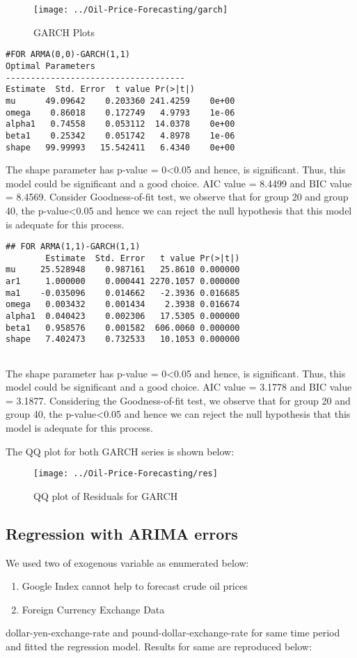 \documentclass[11pt,a4paper]{article}
\begin{document}
\begin{figure}[h!]
	\centering
	\texttt{[image: ../Oil-Price-Forecasting/garch]}
	\caption{GARCH Plots}
	\label{fig:garch}
\end{figure}

\begin{lstlisting}
#FOR ARMA(0,0)-GARCH(1,1)
Optimal Parameters
------------------------------------
Estimate  Std. Error  t value Pr(>|t|)
mu      49.09642    0.203360 241.4259    0e+00
omega    0.86018    0.172749   4.9793    1e-06
alpha1   0.74558    0.053112  14.0378    0e+00
beta1    0.25342    0.051742   4.8978    1e-06
shape   99.99993   15.542411   6.4340    0e+00

\end{lstlisting}
The shape parameter has p-value = 0<0.05 and hence, is significant. Thus, this model could be significant and a good choice. AIC value = 8.4499 and BIC value = 8.4569. Consider Goodness-of-fit test, we observe that for group 20 and group 40, the p-value<0.05 and hence we can reject the null hypothesis that this model is adequate for this process.


\begin{lstlisting}
## FOR ARMA(1,1)-GARCH(1,1)
        Estimate  Std. Error   t value Pr(>|t|)
mu     25.528948    0.987161   25.8610 0.000000
ar1     1.000000    0.000441 2270.1057 0.000000
ma1    -0.035096    0.014662   -2.3936 0.016685
omega   0.003432    0.001434    2.3938 0.016674
alpha1  0.040423    0.002306   17.5305 0.000000
beta1   0.958576    0.001582  606.0060 0.000000
shape   7.402473    0.732533   10.1053 0.000000


\end{lstlisting}
The shape parameter has p-value = 0<0.05 and hence, is significant. Thus, this model could be significant and a good choice. AIC value =  3.1778 and BIC value = 3.1877.
Considering the Goodness-of-fit test, we observe that for group 20 and group 40, the p-value<0.05 and hence we can reject the null hypothesis that this model is adequate for this process.


The QQ plot for both GARCH series is shown below:
\begin{figure}[h!]
	\centering
	\texttt{[image: ../Oil-Price-Forecasting/res]}
	\caption{QQ plot of Residuals for GARCH}
	\label{fig:res}
\end{figure}

\subsection{Regression with ARIMA errors}
We used two of exogenous variable as enumerated below:
\begin{enumerate}
	\item Google Index cannot help to forecast crude oil prices\cite{yao2017forecasting}
	\item Foreign Currency Exchange Data
\end{enumerate}
dollar-yen-exchange-rate and pound-dollar-exchange-rate for same time period and fitted the regression model. Results for same are reproduced below:
\end{document}
